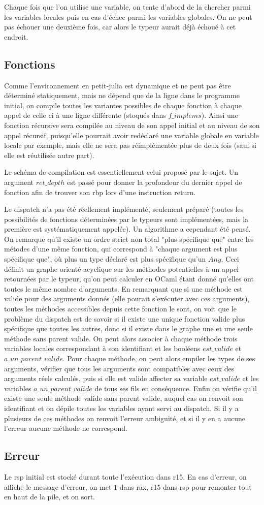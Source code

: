 \documentclass[10pt,a4paper]{article}
\begin{document}
Chaque fois que l'on utilise une variable, on tente d'abord de la chercher parmi les variables locales puis en cas d'échec parmi les variables globales. On ne peut pas échouer une deuxième fois, car alors le typeur aurait déjà échoué à cet endroit.

\subsection{Fonctions}

Comme l'environnement en petit-julia est dynamique et ne peut pas être déterminé
statiquement, mais ne dépend que de la ligne dans le programme initial, on compile
toutes les variantes possibles de chaque fonction à chaque appel de celle ci à une
ligne différente (stoqués dans $f\_implems$). Ainsi une fonction récursive sera
compilée au niveau de son appel initial et au niveau de son appel récursif, puisqu'elle
pourrait avoir redéclaré une variable globale en variable locale par exemple, mais elle
ne sera pas réimplémentée plus de deux fois (sauf si elle est réutilisée autre part).

Le schéma de compilation est essentiellement celui proposé par le sujet. Un argument
$ret\_depth$ est passé pour donner la profondeur du dernier appel de fonction afin
de trouver son rbp lors d'une instruction return.

Le dispatch n'a pas été réellement implémenté, seulement préparé (toutes les
possibilités de fonctions déterminées par le typeurs sont implémentées, mais la
première est systématiquement appelée). Un algorithme a cependant été pensé. On remarque
qu'il existe un ordre strict non total "plus spécifique que" entre les métodes d'une même
fonction, qui correspond à "chaque argument est plus spécifique que", où plus un type
déclaré est plus spécifique qu'un $Any$. Ceci définit un graphe orienté acyclique sur
les méthodes potentielles à un appel retournées par le typeur, qu'on peut calculer en
OCaml étant donné qu'elles ont toutes le même nombre d'arguments. En remarquant que si
une méthode est valide pour des arguments donnés (elle pourait s'exécuter avec ces
arguments), toutes les méthodes accessibles depuis cette fonction le sont, on voit que
le problème du dispatch est de savoir si il existe une unique fonction valide plus
spécifique que toutes les autres, donc si il existe dans le graphe une et une seule
méthode sans parent valide.
On peut alors
associer à chaque méthode trois variables locales correspondant à son identifiant et
les booléens $est\_valide$ et $a\_un\_parent\_valide$. Pour chaque méthode, on peut
alors empiler les types de ses arguments, vérifier que tous les arguments sont compatibles
avec ceux des arguments réels calculés, puis si elle est valide affecter sa variable
$est\_valide$ et les variables $a\_un\_parent\_valide$ de tous ses fils en conséquence.
Enfin on vérifie qu'il existe une seule méthode valide sans parent valide, auquel cas
on renvoit son identifiant et on dépile toutes les variables ayant servi au dispatch. Si il y a plusieurs de ces méthodes on renvoit l'erreur ambiguïté, et si
il y en a aucune l'erreur aucune méthode ne correspond.

\subsection{Erreur}
Le rsp initial est stocké durant toute l'exécution dans r15. En cas d'erreur, on affiche le message d'erreur, on met $1$ dans rax, r15 dans rsp pour remonter tout en haut de la pile, et on sort.
\end{document}
